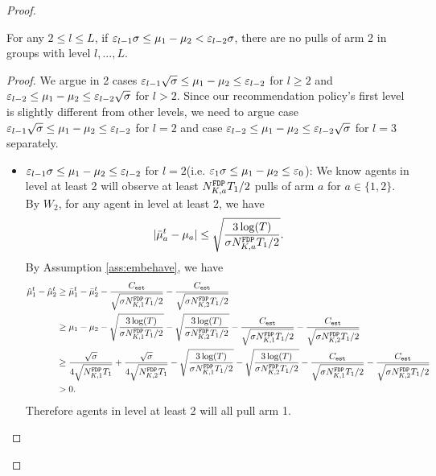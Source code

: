 \begin{proof}
\begin{claim}
\label{clm:l2_exploit}
For any $2 \leq l \leq L$, if $\varepsilon_{l-1} \NG\leq \mu_1 - \mu_2 < \varepsilon_{l-2} \NG$, there are no pulls of arm 2 in groups with level $l,...,L$.
\end{claim}

\begin{proof}
We argue in 2 cases $\varepsilon_{l-1} \sqrt{\NG} \leq \mu_1 - \mu_2 \leq \varepsilon_{l-2}$ for $l \geq 2$ and $\varepsilon_{l-2}  \leq \mu_1 - \mu_2 \leq \varepsilon_{l-2} \sqrt{\NG}$ for $l > 2$. Since our recommendation policy's first level is slightly different from other levels, we need to argue case $\varepsilon_{l-1} \sqrt{\NG} \leq \mu_1 - \mu_2 \leq \varepsilon_{l-2}$ for $l=2$ and case $\varepsilon_{l-2}  \leq \mu_1 - \mu_2 \leq \varepsilon_{l-2} \sqrt{\NG}$ for $l =3$ separately.

\begin{itemize}
\item $\varepsilon_{l-1} \NG \leq \mu_1 - \mu_2 \leq \varepsilon_{l-2}$ for $l = 2$(i.e. $\varepsilon_1\NG\leq \mu_1 - \mu_2 \leq \varepsilon_0$): We know agents in level at least 2 will observe at least $\fdpN T_1/2$ pulls of arm $a$ for $a \in \{1,2\}$. By $W_2$, for any agent in level at least 2, we have
\[
|\bar{\mu}_a^t - \mu_a| \leq \sqrt{\frac{3\log(T)}{\NG\fdpN T_1/2}}.
\]
By Assumption \ref{ass:embehave}, we have
\begin{align*}
\hat{\mu}_1^t - \hat{\mu}_2^t &\geq \bar{\mu}_1^t - \bar{\mu}_2^t - \frac{\estC}{\sqrt{\NG\fdpN[1]T_1/2}} -  \frac{\estC}{\sqrt{\NG\fdpN[2]T_1/2}}\\
&\geq \mu_1 -\mu_2-\sqrt{\frac{3\log(T)}{\NG\fdpN[1]T_1/2}} - \sqrt{\frac{3\log(T)}{\NG\fdpN[2]T_1/2}}- \frac{\estC}{\sqrt{\NG\fdpN[1]T_1/2}} -  \frac{\estC}{\sqrt{\NG\fdpN[2]T_1/2}}\\
&\geq\frac{\sqrt{\NG}}{4\sqrt{\fdpN[1]T_1}} +  \frac{\sqrt{\NG}}{4\sqrt{\fdpN[2]T_1}}-\sqrt{\frac{3\log(T)}{\NG\fdpN[1]T_1/2}} - \sqrt{\frac{3\log(T)}{\NG\fdpN[2]T_1/2}}- \frac{\estC}{\sqrt{\NG\fdpN[1]T_1/2}} -  \frac{\estC}{\sqrt{\NG\fdpN[2]T_1/2}}\\
&>0.
\end{align*}
Therefore agents in level at least 2 will all pull arm 1.


\end{itemize}
\end{proof}
\end{proof}

